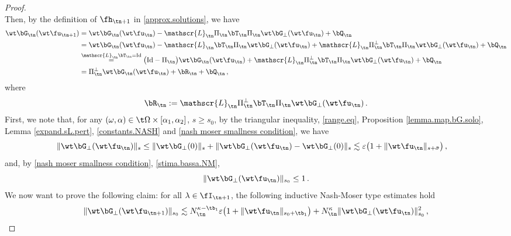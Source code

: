\documentclass[a4paper,reqno,10pt]{article}
\newcommand{\sL}{\mathscr{L}}
\begin{document}
\begin{proof}
\begin{equation}
\end{equation}
Then, by the definition of $\fh_{\tn+1}$ in \eqref{approx.solutions}, we have
\begin{align}
      \wt\bG_{\tn}(\wt\fu_{\tn+1}) &  =  \wt\bG_{\tn}(\wt\fu_{\tn})  - \sL_{\tn} \Pi_{\tn} \bT_{\tn}  \Pi_{\tn} \wt\bG_{\perp}(\wt\fu_{\tn}) + \bQ_{\tn} \\
       &  =  \wt\bG_{\tn}(\wt\fu_{\tn})  - \sL_{\tn}  \bT_{\tn}  \Pi_{\tn} \wt\bG_{\perp}(\wt\fu_{\tn}) +  \sL_{\tn} \Pi_{\tn}^\perp \bT_{\tn}  \Pi_{\tn} \wt\bG_{\perp}(\wt\fu_{\tn}) + \bQ_{\tn}  \\
        &  \stackrel{\sL_{\tn}\bT_{\tn}={\rm Id}}{=}  \big({\rm Id} -\Pi_{\tn} \big) \wt\bG_{\tn}(\wt\fu_{\tn}) +  \sL_{\tn} \Pi_{\tn}^\perp \bT_{\tn}  \Pi_{\tn} \wt\bG_{\perp}(\wt\fu_{\tn}) + \bQ_{\tn} \\
     & = \Pi_{\tn}^\perp \wt\bG_{\tn}(\wt\fu_{\tn})  + \bR_{\tn} + \bQ_{\tn} \,, \label{approx.solutions.eval}
\end{align}
where
\begin{align}
  \bR_{\tn} := \sL_{\tn} \Pi_{\tn}^\perp \bT_{\tn}  \Pi_{\tn} \wt\bG_{\perp}(\wt\fu_{\tn})\,. \label{bRn.bPn}
\end{align}
First, we note that, for any $(\omega,\alpha)\in \t\Omega \times [\alpha_{1},\alpha_{2}]$, $s\geq s_0$, by the triangular inequality, \eqref{range.eq}, Proposition \ref{lemma.map.bG.solo}, Lemma \ref{expand.sL.pert}, \eqref{constants.NASH} and \eqref{nash moser smallness condition}, we have
\begin{align}
    \| \wt\bG_{\perp}(\wt\fu_{\tn}) \|_{s}  & \leq \| \wt\bG_{\perp}(0)\|_{s} + \| \wt\bG_{\perp}(\wt\fu_{\tn}) -\wt\bG_{\perp}(0) \|_{s} \lesssim \varepsilon \big( 1 + \| \wt\fu_{\tn} \|_{s+\bar\sigma}\big)\,, \label{est.bG.at.n.s}
\end{align}
and, by \eqref{nash moser smallness condition}, \eqref{stima.bassa.NM},
\begin{equation}\label{est.bG.at.n.s0}
     \| \wt\bG_{\perp}(\wt\fu_{\tn}) \|_{s_0} \leq 1 \,.
\end{equation}
We now want to prove the following claim: for all $\lambda \in \fI_{\tn+1}$, the following inductive Nash-Moser type estimates hold
\begin{align}
    \| \wt\bG_{\perp}(\wt\fu_{\tn+1}) \|_{s_0} & \lesssim N_{\tn}^{\kappa-\tb_{1}} \varepsilon\big( 1+ \|\wt\fu_{\tn} \|_{s_0+\tb_{1}} \big) + N_{\tn}^{\kappa} \| \wt\bG_{\perp}(\wt\fu_{\tn}) \|_{s_0}^2 \,, \label{NM.est.1} \\

\end{align}
\end{proof}
\end{document}
